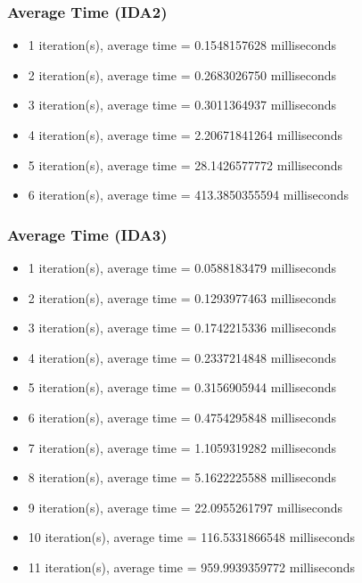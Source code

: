 \documentclass{beamer}
\begin{document}
\begin{frame}
\frametitle{Average Time (IDA2)}

\begin{itemize}
\item
1 iteration(s), average time = 0.1548157628 milliseconds
\item
2 iteration(s), average time = 0.2683026750 milliseconds
\item
3 iteration(s), average time = 0.3011364937 milliseconds
\item
4 iteration(s), average time = 2.20671841264 milliseconds
\item
5 iteration(s), average time = 28.1426577772 milliseconds
\item
6 iteration(s), average time = 413.3850355594 milliseconds
\end{itemize}
\end{frame}

\begin{frame}
\frametitle{Average Time (IDA3)}

\begin{itemize}
\item
1 iteration(s), average time = 0.0588183479 milliseconds
\item
2 iteration(s), average time = 0.1293977463 milliseconds
\item
3 iteration(s), average time = 0.1742215336 milliseconds
\item
4 iteration(s), average time = 0.2337214848 milliseconds
\item
5 iteration(s), average time = 0.3156905944 milliseconds
\item
6 iteration(s), average time = 0.4754295848 milliseconds
\item
7 iteration(s), average time = 1.1059319282 milliseconds
\item
8 iteration(s), average time = 5.1622225588 milliseconds
\item
9 iteration(s), average time = 22.0955261797 milliseconds
\item
10 iteration(s), average time = 116.5331866548 milliseconds
\item
11 iteration(s), average time = 959.9939359772 milliseconds
\end{itemize}
\end{frame}
\end{document}
